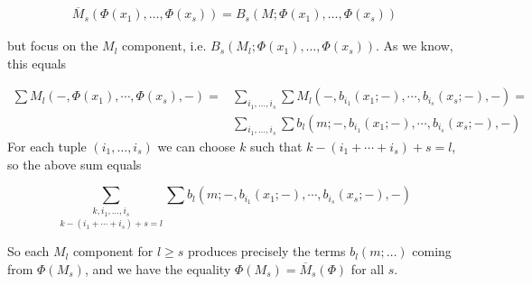 \documentclass[twoside]{article}
\begin{document}
\begin{align*}
\overline{M}_s(\Phi(x_1),\dots, \Phi(x_s))=B_s(M;\Phi(x_1),\dots, \Phi(x_s))
\end{align*}

but focus on the $M_l$ component, i.e. $B_s(M_l;\Phi(x_1),\dots, \Phi(x_s))$. As we know, this equals

\begin{align*}
\sum M_l(-,\Phi(x_1),\cdots, \Phi(x_s),-)=&\sum_{i_1,\dots, i_s}\sum M_l(-,b_{i_1}(x_1;-),\cdots,b_{i_s}(x_s;-),-)=\\
&\sum_{i_1,\dots, i_s}\sum b_l(m;-,b_{i_1}(x_1;-),\cdots,b_{i_s}(x_s;-),-)
\end{align*}
For each tuple $(i_1,\dots, i_s)$ we can choose $k$ such that $k-(i_1+\cdots+i_s)+s=l$, so the above sum equals

$$\underset{k-(i_1+\cdots+i_s)+s=l}{\sum_{k,i_1,\dots, i_s}}\sum b_l(m;-,b_{i_1}(x_1;-),\cdots,b_{i_s}(x_s;-),-)$$

So each $M_l$ component for $l\geq s$ produces precisely the terms $b_l(m;\dots)$ coming from $\Phi(M_s)$, and we have the equality $\Phi(M_s)=\overline{M}_s(\Phi)$ for all $s$.


\end{document}
